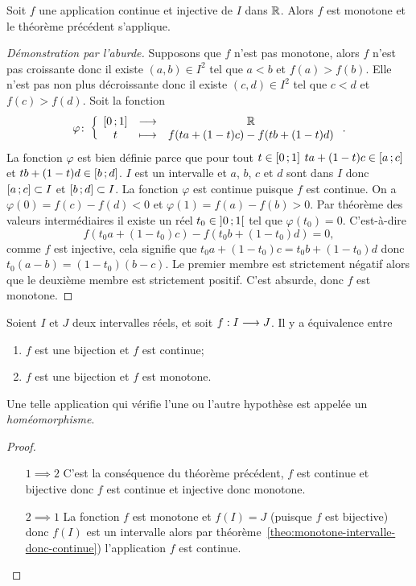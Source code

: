 \begin{theo}
  Soit \(f\) une application continue et injective de \(I\) dans \(\mathbb{R}\). Alors 
  \(f\) est monotone et le théorème précédent s'applique.
\end{theo}
\begin{proof}[Démonstration par l'aburde]
  Supposons que \(f\) n'est pas monotone, alors \(f\) n'est pas croissante donc 
  il existe \((a,b) \in I^2\) tel que \(a < b\) et \(f(a) > f(b)\). Elle n'est 
  pas non plus décroissante donc il existe \((c,d) \in I^2\) tel que \(c < d\) 
  et \(f(c) > f(d)\). Soit la fonction
  \begin{equation}
    \varphi\colon \left\{\begin{array}{ccc} \left[ 0 \, ;  1 \right] & \longrightarrow &\mathbb{R}\\ t & \longmapsto & f(ta+(1-t)c)-f(tb+(1-t)d) \end{array} \right..
  \end{equation}
  La fonction \(\varphi\) est bien définie parce que pour tout \(t \in 
  \left[ 0 \, ;  1 \right]\) \(ta+(1-t)c \in \left[ a \, ;  c \right]\) et \(tb+(1-t)d \in 
  \left[ b \, ;  d \right]\). \(I\) est un intervalle et \(a\), \(b\), \(c\) et \(d\) 
  sont dans \(I\) donc \(\left[ a \, ;  c \right] \subset I\) et 
  \(\left[ b \, ;  d \right] \subset I\). La fonction \(\varphi\) est continue 
  puisque \(f\) est continue. On a \(\varphi(0)=f(c)-f(d) <0\) et 
  \(\varphi(1)=f(a)-f(b) >0\). Par théorème des valeurs intermédiaires il existe 
  un réel \(t_0 \in \left] 0 \, ;  1 \right[\) tel que \(\varphi(t_0)=0\). 
  C'est-à-dire
  \begin{equation}
    f(t_0a+(1-t_0)c)-f(t_0b+(1-t_0)d)=0,
  \end{equation}
  comme \(f\) est injective, cela signifie que \(t_0a+(1-t_0)c=t_0b+(1-t_0)d\) 
  donc \(t_0(a-b)=(1-t_0)(b-c)\). Le premier membre est strictement négatif 
  alors que le deuxième membre est strictement positif. C'est absurde, donc 
  \(f\) est monotone.
\end{proof}
\begin{cor}
  Soient \(I\) et \(J\) deux intervalles réels, et soit \(f:I \longrightarrow J\). 
  Il y a équivalence entre
  \begin{enumerate}
    \item \(f\) est une bijection et \(f\) est continue;
    \item \(f\) est une bijection et \(f\) est monotone.
  \end{enumerate}
  Une telle application qui vérifie l'une ou l'autre hypothèse est appelée un 
  \emph{homéomorphisme}.
\end{cor}
\begin{proof}
  \begin{itemize}
    \item[\(1 \implies 2\)] C'est la conséquence du théorème précédent, \(f\) 
      est continue et bijective donc \(f\) est continue et injective donc 
      monotone.
    \item[\(2 \implies 1\)] La fonction \(f\) est monotone et \(f(I)=J\) 
      (puisque \(f\) est bijective) donc \(f(I)\) est un intervalle alors par 
      théorème~\ref{theo:monotone-intervalle-donc-continue}) l'application \(f\)
      est continue.
  \end{itemize}
\end{proof}


